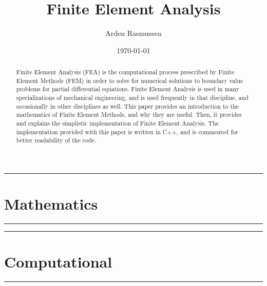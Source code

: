 \documentclass[12pt]{armath}
\title{Finite Element Analysis}
\author{Arden Rasmussen}
\date{\today}
\numberwithin{equation}{section}
\theoremstyle{definition}
\newcommand{\hdiv}[3]{
  \vspace{#1}%
  \noindent\rule{\textwidth}{#2}%
  \vspace{#3}%
}
\begin{document}
\maketitle

\begin{abstract}
  Finite Element Analysis (FEA) is the computational process prescribed by
  Finite Element Methods (FEM) in order to solve for numerical solutions to
  boundary value problems for partial differential equations. Finite Element
  Analysis is used in many specializations of mechanical engineering, and is
  used frequently in that discipline, and occasionally in other disciplines as
  well. This paper provides an introduction to the mathematics of Finite
  Element Methods, and why they are useful. Then, it provides and explains the
  simplistic implementation of Finite Element Analysis. The implementation
  provided with this paper is written in C++, and is commented for better
  readability of the code.
\end{abstract}



\tableofcontents

\newpage
\hdiv{10pt}{0.5pt}{1pt}
\part{Mathematics}%
\label{prt:mathematics}
\hdiv{1pt}{0.5pt}{10pt}













\newpage
\hdiv{10pt}{0.5pt}{1pt}
\part{Computational}%
\label{prt:computational}
\hdiv{1pt}{0.5pt}{10pt}

\newpage
\nocite{*}


\end{document}
